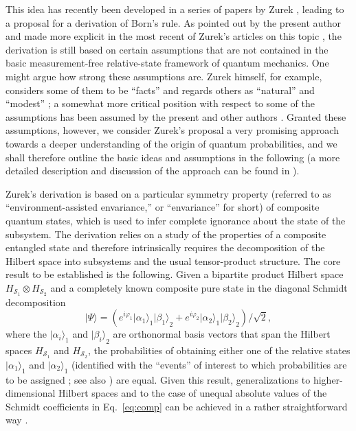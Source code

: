 \documentclass[twocolumn,aps,floatfix,amsmath,amssymb,showpacs,nofootinbib]{revtex4}
\newcommand{\be}{\begin{equation}} \newcommand{\ee}{\end{equation}}
\newcommand{\ket}[1]{\ensuremath{|{#1\rangle}}}
\begin{document}
This idea has recently been developed in a series of papers by Zurek
\cite{Zurek:2002:ii,Zurek:2003:rv,Zurek:2003:pl,Zurek:2004:yb},
leading to a proposal for a derivation of Born's rule. As pointed out
by the present author \cite{Schlosshauer:2003:ms,Schlosshauer:2003:tv}
and made more explicit in the most recent of Zurek's articles on this
topic \cite{Zurek:2004:yb}, the derivation is still based on certain
assumptions that are not contained in the basic measurement-free
relative-state framework of quantum mechanics. One might argue how
strong these assumptions are. Zurek himself, for example, considers
some of them to be ``facts'' and regards others as ``natural'' and
``modest'' \cite{Zurek:2004:yb}; a somewhat more critical position
with respect to some of the assumptions has been assumed by the
present \cite{Schlosshauer:2003:ms} and other authors
\cite{Barnum:2003:yb,Mohrhoff:2004:tv}.  Granted these
assumptions, however, we consider Zurek's proposal a very promising
approach towards a deeper understanding of the origin of quantum
probabilities, and we shall therefore outline the basic ideas and
assumptions in the following (a more detailed description and
discussion of the approach can be found in
\cite{Zurek:2002:ii,Schlosshauer:2003:ms,Schlosshauer:2003:tv,Zurek:2004:yb}).

Zurek's derivation is based on a particular symmetry property
(referred to as ``environment-assisted envariance,'' or ``envariance''
for short) of composite quantum states, which is used to infer
complete ignorance about the state of the subsystem. The derivation
relies on a study of the properties of a composite entangled state and
therefore intrinsically requires the decomposition of the Hilbert
space into subsystems and the usual tensor-product structure. The core
result to be established is the following. Given a bipartite product
Hilbert space $H_{\mathcal{S}_1} \otimes H_{\mathcal{S}_2}$ and a completely
known composite pure state in the diagonal Schmidt decomposition
%
\be \label{eq:comp}
\ket{\Psi} = \left( e^{i\varphi_1} \ket{\alpha_1}_1 \ket{\beta_1}_2
+ e^{i\varphi_2} \ket{\alpha_2}_1 \ket{\beta_2}_2 \right) / \sqrt{2},
\ee
%
where the $\ket{\alpha_i}_1$ and $\ket{\beta_i}_2$ are orthonormal
basis vectors that span the Hilbert spaces $H_{\mathcal{S}_1}$ and
$H_{\mathcal{S}_2}$, the probabilities of obtaining either one of the
relative states $\ket{\alpha_1}_1$ and $\ket{\alpha_2}_1$ (identified
with the ``events'' of interest to which probabilities are to be
assigned \cite[p.~12]{Zurek:2003:pl}; see also
\cite{Schlosshauer:2003:ms}) are equal. Given this result,
generalizations to higher-dimensional Hilbert spaces and to the case
of unequal absolute values of the Schmidt coefficients in
Eq.~\eqref{eq:comp} can be achieved in a rather straightforward way
\cite{Zurek:2004:yb}.
\end{document}
